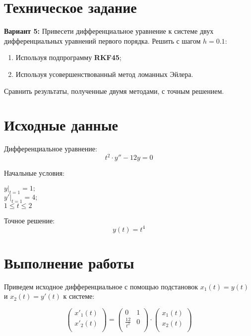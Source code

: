 





\section{Техническое задание}

\textbf{Вариант 5:} Привесети дифференциальное уравнение к системе двух дифференциальных уравнений первого порядка. Решить с шагом $h = 0.1$:
\begin{enumerate}
\item Используя подпрограмму \textbf{RKF45};
\item Используя усовершенствованный метод ломанных Эйлера.
\end{enumerate}
Сравнить результаты, полученные двумя методами, с точным решением.

\section{Исходные данные}

Дифференциальное уравнение:
\[
t^2\cdot y'' - 12y = 0
\]

Начальные условия:
\begin{center}
\begin{multicols}{3} 
	$\left. y \right|_{t=1} = 1;$ \\
	$\left. y' \right|_{t=1} = 4;$ \\
	$1 \le t \le 2$
\end{multicols}
\end{center}

Точное решение:
\[
y(t) = t^4
\]

\section{Выполнение работы}

Приведем исходное дифференциальное с помощью подстановок $x_1(t) = y(t)$ и $x_2(t) = y'(t)$ к системе:

\[
\begin{pmatrix}
    x'_1(t) \\
    x'_2(t) \\
\end{pmatrix}
  =
\begin{pmatrix}
    0 & 1 \\
    \frac{12}{t^2} & 0 \\
\end{pmatrix}
\cdot
\begin{pmatrix}
    x_1(t) \\
    x_2(t) \\
\end{pmatrix}
\]

